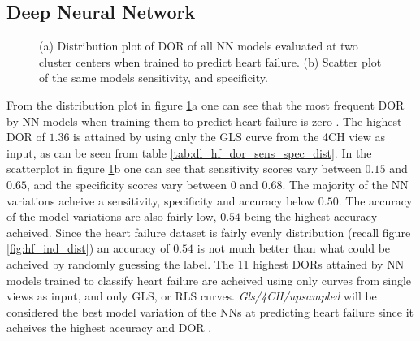 \clearpage

\subsection{Deep Neural Network}

\begin{figure}[H]
    \centering
    
    \caption{(a) Distribution plot of DOR of all NN models evaluated at two cluster centers when trained to predict heart failure.
             (b) Scatter plot of the same models sensitivity, and specificity.}
    \label{fig:dl_hf_dor_sens_spec_dist}
\end{figure}

From the distribution plot in figure \ref{fig:dl_hf_dor_sens_spec_dist}a one can see that the most frequent DOR by NN models when training them to predict heart failure is zero .
The highest DOR of $1.36$ is attained by using only the GLS curve from the 4CH view as input, as can be seen from table \ref{tab:dl_hf_dor_sens_spec_dist}.
In the scatterplot in figure \ref{fig:dl_hf_dor_sens_spec_dist}b one can see that sensitivity scores vary between $0.15$ and $0.65$, and the specificity scores vary between $0$ and $0.68$.
The majority of the NN variations acheive a sensitivity, specificity and accuracy below $0.50$.
The accuracy of the model variations are also fairly low, $0.54$ being the highest accuracy acheived.
Since the heart failure dataset is fairly evenly distribution (recall figure \ref{fig:hf_ind_dist}) an accuracy of $0.54$ is not much better than what could be acheived 
by randomly guessing the label. 
The 11 highest DORs attained by NN models trained to classify heart failure are acheived using only curves from single views as input, and only GLS, or RLS curves.
\textit{Gls/4CH/upsampled} will be considered the best model variation of the NNs at predicting heart failure since it acheives the highest accuracy and DOR . \bigskip

